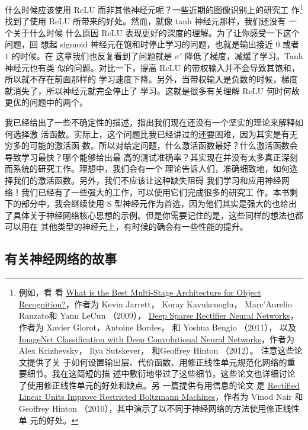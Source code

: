 什么时候应该使用 ReLU 而非其他神经元呢？一些近期的图像识别上的研究工
作\footnote{例如，看
  看 \href{http://yann.lecun.com/exdb/publis/pdf/jarrett-iccv-09.pdf}{What is
    the Best Multi-Stage Architecture for Object Recognition?}，作者为 Kevin
  Jarrett， Koray Kavukcuoglu， Marc'Aurelio Ranzato和 Yann
  LeCun （2009），
  \href{http://www.jmlr.org/proceedings/papers/v15/glorot11a.html}{Deep Sparse
    Rectiﬁer Neural Networks}，作者为 Xavier Glorot，Antoine Bordes， 和 Yoshua
  Bengio （2011）， 以及
  \href{https://papers.nips.cc/paper/4824-imagenet-classification-with-deep-convolutional-neural-networks.pdf}{ImageNet
    Classification with Deep Convolutional Neural Networks}，作者为 Alex
  Krizhevsky， Ilya Sutskever， 和Geoffrey Hinton （2012）。 注意这些论文提供了关
  于如何设置输出层、代价函数、用修正线性单元规范化网络的重要细节。我在这简短的描
  述中敷衍地带过了这些细节。这些论文也详细讨论了使用修正线性单元的好处和缺点。另
  一篇提供有用信息的论文
  是 \href{https://www.cs.toronto.edu/~hinton/absps/reluICML.pdf}{Rectified
    Linear Units Improve Restricted Boltzmann Machines}，作者为 Vinod
  Nair 和Geoffrey Hinton （2010），其中演示了以不同于神经网络的方法使用修正线性单
  元的好处。}找到了使用 ReLU 所带来的好处。然而，就像 tanh 神经元那样，我们还没有
一个关于什么时候 什么原因 ReLU 表现更好的深度的理解。为了让你感受一下这个问题，回
想起 sigmoid 神经元在饱和时停止学习的问题，也就是输出接近 $0$ 或者 $1$ 的时候。在
这章我们也反复看到了问题就是 $\sigma'$ 降低了梯度，减缓了学习。Tanh 神经元也有类
似的问题。对比一下，提高 ReLU 的带权输入并不会导致其饱和，所以就不存在前面那样的
学习速度下降。另外，当带权输入是负数的时候，梯度就消失了，所以神经元就完全停止了
学习。这就是很多有关理解 ReLU 何时何故更优的问题中的两个。

我已经给出了一些不确定性的描述，指出我们现在还没有一个坚实的理论来解释如何选择激
活函数。实际上，这个问题比我已经讲过的还要困难，因为其实是有无穷多的可能的激活函
数。所以对给定问题，什么激活函数最好？什么激活函数会导致学习最快？哪个能够给出最
高的测试准确率？其实现在并没有太多真正深刻而系统的研究工作。理想中，我们会有一个
理论告诉人们，准确细致地，如何选择我们的激活函数。另外，我们不应该让这种缺失阻碍
我们学习和应用神经网络！我们已经有了一些强大的工作，可以使用它们完成很多的研究工
作。本书剩下的部分中，我会继续使用 S 型神经元作为首选，因为他们其实是强大的也给出
了具体关于神经网络核心思想的示例。但是你需要记住的是，这些同样的想法也都可以用在
其他类型的神经元上，有时候的确会有一些性能的提升。

\subsection{有关神经网络的故事}

